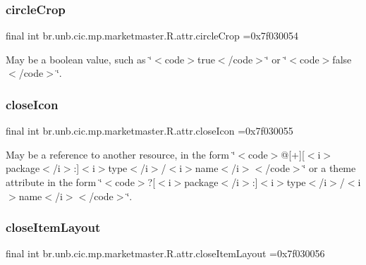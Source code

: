 \subsubsection{\texorpdfstring{circle\+Crop}{circleCrop}}
{\footnotesize\ttfamily final int br.\+unb.\+cic.\+mp.\+marketmaster.\+R.\+attr.\+circle\+Crop =0x7f030054\hspace{0.3cm}{\ttfamily [static]}}

May be a boolean value, such as \char`\"{}$<$code$>$true$<$/code$>$\char`\"{} or \char`\"{}$<$code$>$false$<$/code$>$\char`\"{}. \mbox{\label{classbr_1_1unb_1_1cic_1_1mp_1_1marketmaster_1_1R_1_1attr_ad934343bc7317b9592defa766c30ddb9}} 
\subsubsection{\texorpdfstring{close\+Icon}{closeIcon}}
{\footnotesize\ttfamily final int br.\+unb.\+cic.\+mp.\+marketmaster.\+R.\+attr.\+close\+Icon =0x7f030055\hspace{0.3cm}{\ttfamily [static]}}

May be a reference to another resource, in the form \char`\"{}$<$code$>$@\mbox{[}+\mbox{]}\mbox{[}$<$i$>$package$<$/i$>$\+:\mbox{]}$<$i$>$type$<$/i$>$/$<$i$>$name$<$/i$>$$<$/code$>$\char`\"{} or a theme attribute in the form \char`\"{}$<$code$>$?\mbox{[}$<$i$>$package$<$/i$>$\+:\mbox{]}$<$i$>$type$<$/i$>$/$<$i$>$name$<$/i$>$$<$/code$>$\char`\"{}. \mbox{\label{classbr_1_1unb_1_1cic_1_1mp_1_1marketmaster_1_1R_1_1attr_adc755c9a394c6704495acbd446eaa737}} 
\subsubsection{\texorpdfstring{close\+Item\+Layout}{closeItemLayout}}
{\footnotesize\ttfamily final int br.\+unb.\+cic.\+mp.\+marketmaster.\+R.\+attr.\+close\+Item\+Layout =0x7f030056\hspace{0.3cm}{\ttfamily [static]}}

